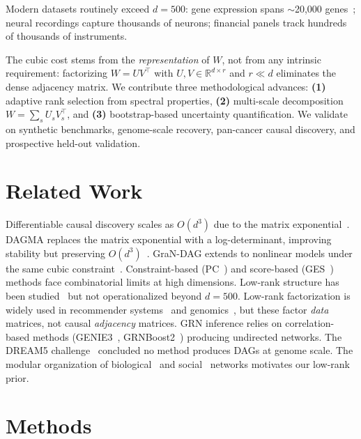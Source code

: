 \documentclass{article}
\theoremstyle{definition}
\begin{document}
Modern datasets routinely exceed $d=500$: gene expression spans $\sim$20,000 genes~\citep{weinstein2013tcga}; neural recordings capture thousands of neurons; financial panels track hundreds of thousands of instruments.

The cubic cost stems from the \emph{representation} of $W$, not from any intrinsic requirement: factorizing $W = U V^\top$ with $U, V \in \mathbb{R}^{d \times r}$ and $r \ll d$ eliminates the dense adjacency matrix. We contribute three methodological advances: \textbf{(1)} adaptive rank selection from spectral properties, \textbf{(2)} multi-scale decomposition $W = \sum_s U_s V_s^\top$, and \textbf{(3)} bootstrap-based uncertainty quantification. We validate on synthetic benchmarks, genome-scale recovery, pan-cancer causal discovery, and prospective held-out validation.

\section{Related Work}

Differentiable causal discovery scales as $O(d^3)$ due to the matrix exponential~\citep{yu2019daggnn,ng2020golem,bello2022dagma}. DAGMA replaces the matrix exponential with a log-determinant, improving stability but preserving $O(d^3)$~\citep{bello2022dagma}. GraN-DAG extends to nonlinear models under the same cubic constraint~\citep{lachapelle2019gradient}. Constraint-based (PC~\citep{spirtes2000causation}) and score-based (GES~\citep{chickering2002optimal}) methods face combinatorial limits at high dimensions. Low-rank structure has been studied~\citep{chen2023lowrank} but not operationalized beyond $d=500$. Low-rank factorization is widely used in recommender systems~\citep{koren2009matrix} and genomics~\citep{leek2007capturing,townes2019feature}, but these factor \emph{data} matrices, not causal \emph{adjacency} matrices. GRN inference relies on correlation-based methods (GENIE3~\citep{huynh2010inferring}, GRNBoost2~\citep{moerman2019grnboost2}) producing undirected networks. The DREAM5 challenge~\citep{marbach2012wisdom} concluded no method produces DAGs at genome scale. The modular organization of biological~\citep{hanahan2011hallmarks,kanehisa2000kegg} and social~\citep{girvan2002community,newman2006modular} networks motivates our low-rank prior.

\section{Methods}
\label{sec:methods}
\end{document}
